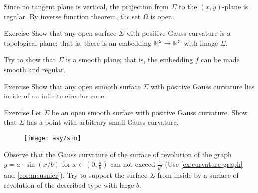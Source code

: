 Since no tangent plane is vertical, the projection from $\Sigma$ to the $(x,y)$-plane is regular.
By inverse function theorem, the set $\Omega$ is open.\qeds

\begin{thm}{Exercise}
Show that any open surface $\Sigma$ with positive Gauss curvature is a topological plane;
that is, there is an embedding $\mathbb{R}^2\to\mathbb{R}^3$ with image $\Sigma$.

Try to show that $\Sigma$ is a smooth plane; that is, the embedding $f$ can be made smooth and regular.
\end{thm}

\begin{thm}{Exercise}\label{ex:circular-cone}
Show that any open smooth surface $\Sigma$ with positive Gauss curvature
lies inside of an infinite circular cone. 
\end{thm}

\begin{thm}{Exercise}\label{ex:small-gauss}
Let $\Sigma$ be an open smooth surface with positive Gauss curvature.
Show that $\Sigma$ has a point with arbitrary small Gauss curvature.
\end{thm}

\begin{wrapfigure}{r}{40 mm}
\vskip-0mm
\centering
\texttt{[image: asy/sin]}
\vskip-3mm
\end{wrapfigure}

Observe that the Gauss curvature of the surface of revolution of the graph $y=a\cdot \sin (x/b)$ for $x\in(0,\tfrac\pi b)$ can not exceed $\tfrac{1}{b^2}$ (Use \ref{ex:curvature-graph} and \ref{cor:meusnier}).
Try to support the surface $\Sigma$ from inside by a surface of revolution of the described type with large $b$. 


 

